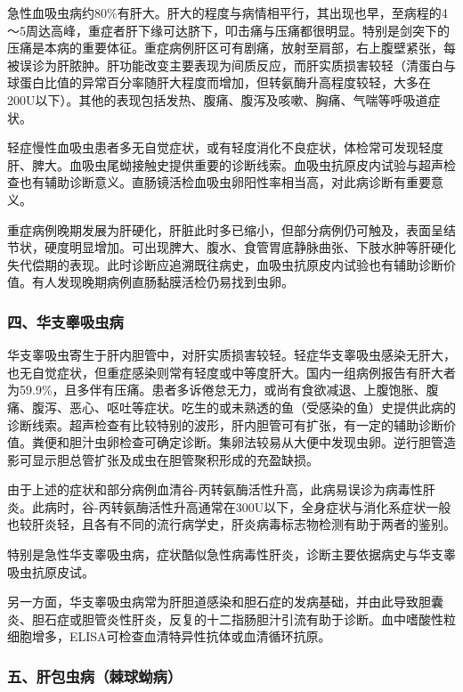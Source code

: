 急性血吸虫病约80\%有肝大。肝大的程度与病情相平行，其出现也早，至病程的4～5周达高峰，重症者肝下缘可达脐下，叩击痛与压痛都很明显。特别是剑突下的压痛是本病的重要体征。重症病例肝区可有剧痛，放射至肩部，右上腹壁紧张，每被误诊为肝脓肿。肝功能改变主要表现为间质反应，而肝实质损害较轻（清蛋白与球蛋白比值的异常百分率随肝大程度而增加，但转氨酶升高程度较轻，大多在200U以下）。其他的表现包括发热、腹痛、腹泻及咳嗽、胸痛、气喘等呼吸道症状。

轻症慢性血吸虫患者多无自觉症状，或有轻度消化不良症状，体检常可发现轻度肝、脾大。血吸虫尾蚴接触史提供重要的诊断线索。血吸虫抗原皮内试验与超声检查也有辅助诊断意义。直肠镜活检血吸虫卵阳性率相当高，对此病诊断有重要意义。

重症病例晚期发展为肝硬化，肝脏此时多已缩小，但部分病例仍可触及，表面呈结节状，硬度明显增加。可出现脾大、腹水、食管胃底静脉曲张、下肢水肿等肝硬化失代偿期的表现。此时诊断应追溯既往病史，血吸虫抗原皮内试验也有辅助诊断价值。有人发现晚期病例直肠黏膜活检仍易找到虫卵。

\subsubsection{四、华支睾吸虫病}

华支睾吸虫寄生于肝内胆管中，对肝实质损害较轻。轻症华支睾吸虫感染无肝大，也无自觉症状，但重症感染则常有轻度或中等度肝大。国内一组病例报告有肝大者为59.9\%，且多伴有压痛。患者多诉倦怠无力，或尚有食欲减退、上腹饱胀、腹痛、腹泻、恶心、呕吐等症状。吃生的或未熟透的鱼（受感染的鱼）史提供此病的诊断线索。超声检查有比较特别的波形，肝内胆管可有扩张，有一定的辅助诊断价值。粪便和胆汁虫卵检查可确定诊断。集卵法较易从大便中发现虫卵。逆行胆管造影可显示胆总管扩张及成虫在胆管聚积形成的充盈缺损。

由于上述的症状和部分病例血清谷-丙转氨酶活性升高，此病易误诊为病毒性肝炎。此病时，谷-丙转氨酶活性升高通常在300U以下，全身症状与消化系症状一般也较肝炎轻，且各有不同的流行病学史，肝炎病毒标志物检测有助于两者的鉴别。

特别是急性华支睾吸虫病，症状酷似急性病毒性肝炎，诊断主要依据病史与华支睾吸虫抗原皮试。

另一方面，华支睾吸虫病常为肝胆道感染和胆石症的发病基础，并由此导致胆囊炎、胆石症或胆管炎性肝炎，反复的十二指肠胆汁引流有助于诊断。血中嗜酸性粒细胞增多，ELISA可检查血清特异性抗体或血清循环抗原。

\subsubsection{五、肝包虫病（棘球蚴病）}

